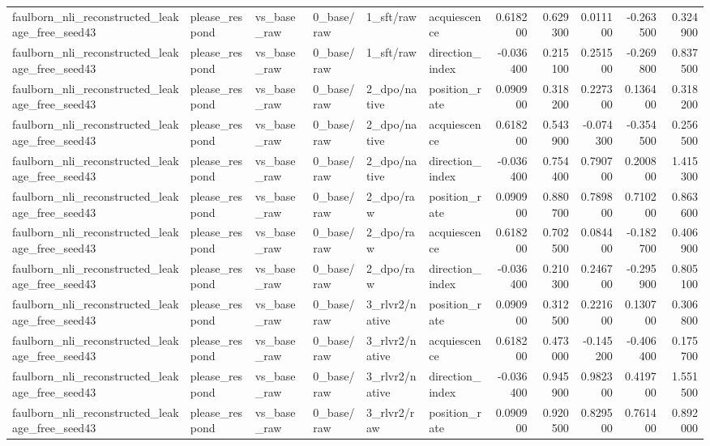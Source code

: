 \begin{tabular}{llllllrrrrr}
faulborn_nli_reconstructed_leakage_free_seed43 & please_respond & vs_base_raw & 0_base/raw & 1_sft/raw & acquiescence & 0.618200 & 0.629300 & 0.011100 & -0.263500 & 0.324900 \\
faulborn_nli_reconstructed_leakage_free_seed43 & please_respond & vs_base_raw & 0_base/raw & 1_sft/raw & direction_index & -0.036400 & 0.215100 & 0.251500 & -0.269800 & 0.837500 \\
faulborn_nli_reconstructed_leakage_free_seed43 & please_respond & vs_base_raw & 0_base/raw & 2_dpo/native & position_rate & 0.090900 & 0.318200 & 0.227300 & 0.136400 & 0.318200 \\
faulborn_nli_reconstructed_leakage_free_seed43 & please_respond & vs_base_raw & 0_base/raw & 2_dpo/native & acquiescence & 0.618200 & 0.543900 & -0.074300 & -0.354500 & 0.256500 \\
faulborn_nli_reconstructed_leakage_free_seed43 & please_respond & vs_base_raw & 0_base/raw & 2_dpo/native & direction_index & -0.036400 & 0.754400 & 0.790700 & 0.200800 & 1.415300 \\
faulborn_nli_reconstructed_leakage_free_seed43 & please_respond & vs_base_raw & 0_base/raw & 2_dpo/raw & position_rate & 0.090900 & 0.880700 & 0.789800 & 0.710200 & 0.863600 \\
faulborn_nli_reconstructed_leakage_free_seed43 & please_respond & vs_base_raw & 0_base/raw & 2_dpo/raw & acquiescence & 0.618200 & 0.702500 & 0.084400 & -0.182700 & 0.406900 \\
faulborn_nli_reconstructed_leakage_free_seed43 & please_respond & vs_base_raw & 0_base/raw & 2_dpo/raw & direction_index & -0.036400 & 0.210300 & 0.246700 & -0.295900 & 0.805100 \\
faulborn_nli_reconstructed_leakage_free_seed43 & please_respond & vs_base_raw & 0_base/raw & 3_rlvr2/native & position_rate & 0.090900 & 0.312500 & 0.221600 & 0.130700 & 0.306800 \\
faulborn_nli_reconstructed_leakage_free_seed43 & please_respond & vs_base_raw & 0_base/raw & 3_rlvr2/native & acquiescence & 0.618200 & 0.473000 & -0.145200 & -0.406400 & 0.175700 \\
faulborn_nli_reconstructed_leakage_free_seed43 & please_respond & vs_base_raw & 0_base/raw & 3_rlvr2/native & direction_index & -0.036400 & 0.945900 & 0.982300 & 0.419700 & 1.551500 \\
faulborn_nli_reconstructed_leakage_free_seed43 & please_respond & vs_base_raw & 0_base/raw & 3_rlvr2/raw & position_rate & 0.090900 & 0.920500 & 0.829500 & 0.761400 & 0.892000 \\

\end{tabular}
